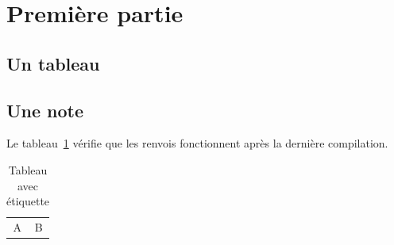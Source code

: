 
\section{Première partie}

\subsection{Un tableau}


\subsection{Une note}


Le tableau~\ref{tab:exemple} vérifie que les renvois fonctionnent
après la dernière compilation.

\begin{table}[H]
    \centering
    \begin{tabular}{cc}
        A & B \\
    \end{tabular}
    \caption{Tableau avec étiquette}
    \label{tab:exemple}
\end{table}
